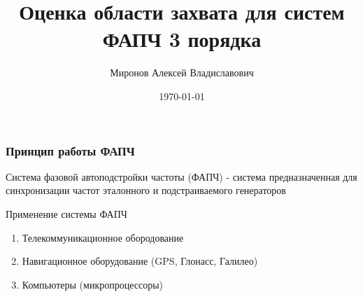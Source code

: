 \documentclass{beamer}
\title[Оценка области захвата для систем]{Оценка области захвата для систем ФАПЧ 3 порядка} %
\author{Миронов Алексей Владиславович} %
\institute[СПБГУ] %
{
Санкт-Петербургский государственный университет\\ %
\vspace{0.7cm}
    Научный руководитель:  д.ф.-м. н., профессор Юлдашев Р. В. \\
    \vspace{0.7cm}
}
\date{\today} %
\begin{document}
\begin{frame}
\titlepage %
\end{frame}


\begin{frame}
\frametitle{Принцип работы ФАПЧ}
\begin{definition}
Система фазовой автоподстройки частоты (ФАПЧ) - система предназначенная для синхронизации частот эталонного и подстраиваемого генераторов
\end{definition}
Применение системы ФАПЧ
\begin{enumerate}
\item Телекоммуникационное обородование
\item Навигационное оборудование (GPS, Глонасс, Галилео)
\item Компьютеры (микропроцессоры)
\end{enumerate}
\end{frame}
\end{document}
